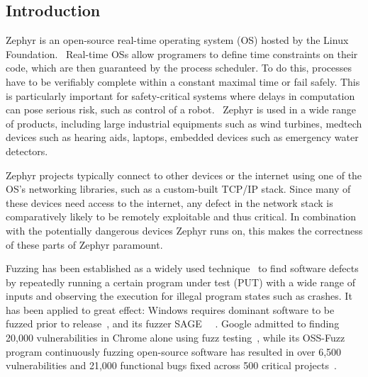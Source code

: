 \documentclass{article}
\let\savedCite=\cite
\renewcommand{\cite}{\unskip~\savedCite}
\begin{document}
\begin{multicols}{2}
  \tableofcontents


  \section{Introduction}
  \label{Introduction}

  Zephyr is an open-source real-time operating system (OS) hosted by the Linux Foundation.\cite{ZephyrAbout} Real-time OSs allow programers to define time constraints on their code, which are then guaranteed by the process scheduler. To do this, processes have to be verifiably complete within a constant maximal time or fail safely. This is particularly important for safety-critical systems where delays in computation can pose serious risk, such as control of a robot.\cite{RTOSWiki} Zephyr is used in a wide range of products, including large industrial equipments such as wind turbines, medtech devices such as hearing aids, laptops, embedded devices such as emergency water detectors.\cite{ZephyrUsedIn}

  Zephyr projects typically connect to other devices or the internet using one of the OS's networking libraries, such as a custom-built TCP/IP stack. Since many of these devices need access to the internet, any defect in the network stack is comparatively likely to be remotely exploitable and thus critical. In combination with the potentially dangerous devices Zephyr runs on, this makes the correctness of these parts of Zephyr paramount.

  Fuzzing has been established as a widely used technique\cite{Demystifying} to find software defects by repeatedly running a certain program under test (PUT) with a wide range of inputs and observing the execution for illegal program states such as crashes. It has been applied to great effect: Windows requires dominant software to be fuzzed prior to release\cite{Demystifying}, and its fuzzer SAGE\cite{SAGE} \cite{FuzzingTheStateOfTheArt}. Google admitted to finding 20,000 vulnerabilities in Chrome alone using fuzz testing\cite{Demystifying}, while its OSS-Fuzz program continuously fuzzing open-source software has resulted in over 6,500 vulnerabilities and 21,000 functional bugs fixed across 500 critical projects\cite{ClusterFuzzLite}.


\end{multicols}
\end{document}
